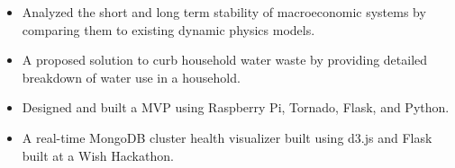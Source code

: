 \documentclass[10pt,a4paper,academicons]{altacv}
\begin{document}
\begin{itemize}
\item Analyzed the short and long term stability of macroeconomic systems by
    comparing them to existing dynamic physics models.
\end{itemize}


\begin{itemize}
\item A proposed solution to curb household water waste by providing detailed breakdown of water use in a household.
\item Designed and built a MVP using Raspberry Pi, Tornado, Flask, and Python.
\end{itemize}
\divider

\begin{itemize}
\item A real-time MongoDB cluster health visualizer built using d3.js and Flask
    built at a Wish Hackathon.
\end{itemize}
\end{document}
